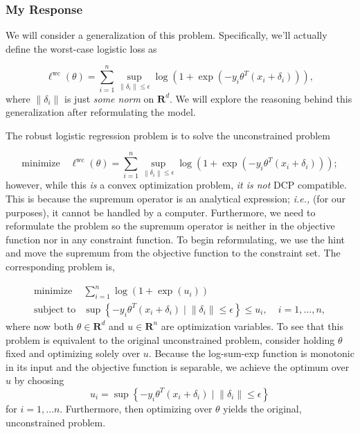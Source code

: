 \documentclass[12pt,reqno]{article}
\theoremstyle{definition}
\numberwithin{equation}{section}
\begin{document}
\subsubsection*{My Response}

\noindent We will consider a generalization of this problem. Specifically, we'll actually define the worst-case logistic loss as

\[
\ell^{\mathrm{wc}}(\theta)=\sum_{i=1}^n \sup _{\left\|\delta_i\right\| \leq \epsilon} \log \left(1+\exp \left(-y_i \theta^T\left(x_i+\delta_i\right)\right)\right),
\]
where $\left\lVert \delta_i \right\rVert$ is just \textit{some norm} on $\mathbf{R}^{d}$. We will explore the reasoning behind
this generalization after reformulating the model.

\noindent The robust logistic regression problem is to solve the unconstrained problem

\[\mathrm{minimize} \quad \ell^{\mathrm{wc}}(\theta)=\sum_{i=1}^n \sup _{\left\|\delta_i\right\| \leq \epsilon} \log \left(1+\exp \left(-y_i \theta^T\left(x_i+\delta_i\right)\right)\right);\]
however, while this \textit{is} a convex optimization problem, \textit{it is not} DCP compatible. This is because
the supremum operator is an analytical expression; \textit{i.e.,} (for our purposes), it cannot be handled by a computer.
Furthermore, we need to reformulate the problem so the supremum operator is neither in the objective function nor in any
constraint function. To begin reformulating, we use the hint and move the supremum from the objective function
to the constraint set. The corresponding problem is,

\[\begin{array}{lll}
\text{minimize} \; & \sum_{i=1}^n \log \left(1+\exp \left(u_i\right)\right) & \\
\text{subject to} & \sup \left\{-y_i \theta^T\left(x_i+\delta_i\right) \mid \left\lVert \delta_i \right\rVert \le \epsilon \right\} \le u_i, \; & i = 1, \ldots, n,
\end{array}\]
where now both $\theta \in \mathbf{R}^d$ and $u \in \mathbf{R}^n$ are optimization variables.
To see that this problem is equivalent to the original unconstrained problem, consider holding $\theta$ fixed
and optimizing solely over $u$. Because the log-sum-exp function is monotonic in its input and the objective function
is separable, we achieve the optimum over $u$ by choosing
\[u_i = \sup \left\{-y_i \theta^T\left(x_i+\delta_i\right) \mid \left\lVert \delta_i \right\rVert \le \epsilon \right\} \]
for $i = 1, \ldots n$. Furthermore, then optimizing over $\theta$ yields the original, unconstrained problem.
\end{document}
